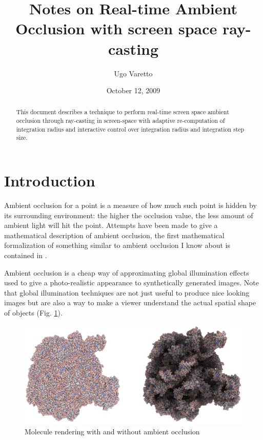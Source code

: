 \documentclass{article}
\begin{document}
\title{Notes on Real-time Ambient Occlusion with screen space ray-casting}
\author{Ugo Varetto}
\date{October 12, 2009}

\maketitle

\begin{abstract}
\noindent This document describes a technique to perform real-time screen space ambient occlusion
through ray-casting in screen-space with adaptive re-computation of integration radius
and interactive control over integration radius and integration step size.
\end{abstract}


\section{Introduction}

Ambient occlusion for a point is a measure of how much such point is hidden by
its surrounding environment: the higher the occlusion value, the less amount of
ambient light will hit the point. Attempts have been made to give a mathematical
description of ambient occlusion, the first mathematical formalization
of something similar to ambient occlusion I know about is contained in \cite{Zhukov et al. 1998}.

Ambient occlusion is a cheap way of approximating global illumination effects used
to give a photo-realistic appearance to synthetically generated images. Note that global
illumination techniques are not just useful to produce nice looking images
but are also a way to make a viewer understand the actual spatial shape of objects (Fig.
 \ref{aoandnoao}).

\begin{figure}[!ht]
\caption{Molecule rendering with and without ambient occlusion}
\begin{center}
\includegraphics[width=12cm]{images/AO_AND_NOAO.png}
\end{center}
\label{aoandnoao}
\end{figure}
\end{document}

